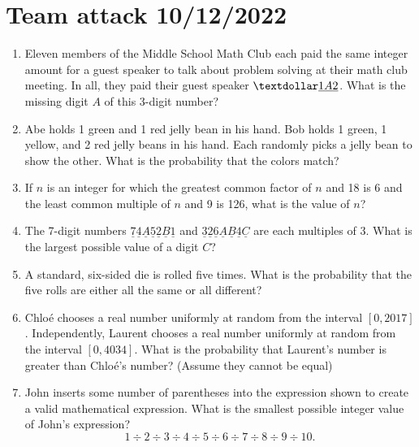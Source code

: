 \documentclass[12pt]{article}
\begin{document}
    \section*{Team attack 10/12/2022}
    \begin{enumerate}[leftmargin=3mm]
        \item Eleven members of the Middle School Math Club each paid the same integer amount for a guest speaker to talk about problem solving at their math club meeting. In all, they paid their guest speaker $\textdollar\underline{1}\underline{A}\underline{2}$. What is the missing digit $A$ of this 3-digit number? %
        \item Abe holds 1 green and 1 red jelly bean in his hand. Bob holds 1 green, 1 yellow, and 2 red jelly beans in his hand. Each randomly picks a jelly bean to show the other. What is the probability that the colors match? %
        \item If $n$ is an integer for which the greatest common factor of $n$ and 18 is 6 and the
        least common multiple of $n$ and 9 is 126, what is the value of $n$? %
        \item The 7-digit numbers $\underline{7} \underline{4} \underline{A} \underline{5} \underline{2} \underline{B} \underline{1}$ and $\underline{3} \underline{2} \underline{6} \underline{A} \underline{B} \underline{4} \underline{C}$ are each multiples of 3. What is the largest possible value of a digit $C$? %
        \item A standard, six-sided die is rolled five times. What is the probability that the five
        rolls are either all the same or all different? %
        \item Chloé chooses a real number uniformly at random from the interval $[0, 2017]$. Independently, Laurent chooses a real number uniformly at random from the interval $[0, 4034]$. What is the probability that Laurent's number is greater than Chloé's number? (Assume they cannot be equal) %
        \item John inserts some number of parentheses into the expression shown to create a valid mathematical expression. What is the smallest possible integer value of John’s expression? 
        \[ 1 \div 2 \div 3 \div 4 \div 5 \div 6 \div 7 \div 8 \div 9 \div 10.\] %
    \end{enumerate}
\end{document}
